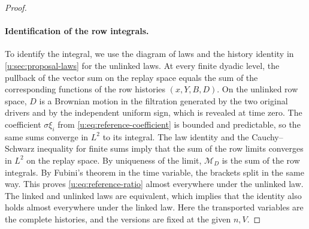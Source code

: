 \begin{proof}
\paragraph{Identification of the row integrals.}
To identify the integral, we use the diagram of laws and the history
identity in \cref{u:sec:proposal-laws} for the unlinked laws. At every
finite dyadic level, the pullback of the vector sum on the replay
space equals the sum of the corresponding functions of the row
histories $(x,Y,B,D)$. On the unlinked
row space, $D$ is a Brownian motion in the filtration generated by the two original
drivers and by the independent uniform sign, which is revealed at time zero. The
coefficient $\sigma\xi_i$ from \eqref{u:eq:reference-coefficient} is bounded and
predictable, so the same sums converge in $L^2$ to its integral. The law identity and the
Cauchy--Schwarz inequality for finite sums imply that the sum of the row limits
converges in $L^2$ on the replay space. By uniqueness of the limit, $\mathscr M_D$ is
the sum of the row integrals. By Fubini's theorem in the time variable,
the brackets split in the same way.
This proves \eqref{u:eq:reference-ratio} almost everywhere under the
unlinked law. The linked and unlinked laws are equivalent, which implies that the
identity also holds almost everywhere under the linked law. Here the transported variables are the complete histories, and the
versions are fixed at the given $n,V$.


\end{proof}
